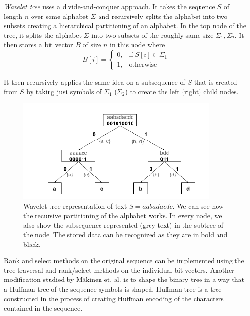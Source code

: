 \textit{Wavelet tree} uses a divide-and-conquer approach. It takes the sequence $S$ of
length $n$ over some alphabet $\Sigma$ and recursively splits the alphabet into
two subsets creating a hierarchical partitioning of an alphabet. In the top node
of the tree, it splits the alphabet $\Sigma$ into two subsets of the roughly same
size $\Sigma_1, \Sigma_2$. It then stores a bit vector $B$ of size $n$ in this node
where
\[
    B[i]= 
\begin{cases}
    0,& \text{if } S[i]\in \Sigma_1\\
    1,              & \text{otherwise}
\end{cases}
\]

It then recursively applies the same idea on a subsequence of $S$ that is created
from $S$ by taking just symbols of $\Sigma_1$ ($\Sigma_2$) to create the left (right)
child nodes.

\begin{figure}
	\centerline{
		\includegraphics[width=0.9\textwidth, height=0.3\textheight]{images/wavelet_tree}
	}
	\caption[TODO]{Wavelet tree representation of text $S=aabadacdc$. We can see how the
	recursive partitioning of the alphabet works. In every node, we also show the
	subsequence represented (grey text) in the subtree of the node. The stored data can be
	recognized as they are in bold and black.
	}
	\label{obr:WaveletTreeExample}
\end{figure}

Rank and select methods on the original sequence can be implemented using the tree
traversal and rank/select methods on the individual bit-vectors. Another modification
studied by M{\"a}kinen et. al.\cite{makinen2005succinct} is to shape the binary tree in a way that a Huffman
tree of the sequence symbols is shaped. Huffman tree is a tree constructed in the
process of creating Huffman encoding of the characters contained in the sequence.